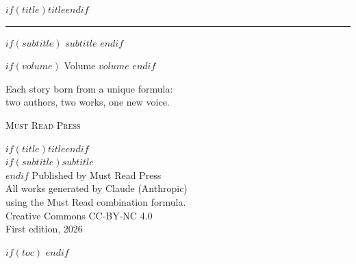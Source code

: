 \documentclass[11pt,twoside,openany]{book}
\let\oldrule\rule
\begin{document}
\begin{titlepage}
  \thispagestyle{empty}
  \vspace*{\fill}
  \begin{center}
    {\displayfont\huge\textcolor{espresso}{$if(title)$$title$$endif$}}

    \vspace{1em}
    \textcolor{goldenrod}{\oldrule{5cm}{0.4pt}}

    $if(subtitle)$
    \vspace{1em}
    {\displayfont\large\textcolor{muted}{\textit{$subtitle$}}}
    $endif$

    $if(volume)$
    \vspace{0.8em}
    {\small\textcolor{muted}{Volume $volume$}}
    $endif$

    \vspace{2em}
    {\small\textcolor{muted}{Each story born from a unique formula:\\
    two authors, two works, one new voice.}}

    \vspace{\fill}
    {\small\textsc{Must Read Press}}
  \end{center}
  \vspace*{\fill}
\end{titlepage}

\thispagestyle{empty}
\vspace*{\fill}
\begin{center}
  {\small
    $if(title)$$title$$endif$\\
    $if(subtitle)$\textit{$subtitle$}\\$endif$
    \vspace{1em}
    Published by Must Read Press\\
    \vspace{0.5em}
    All works generated by Claude (Anthropic)\\
    using the Must Read combination formula.\\
    \vspace{1em}
    Creative Commons CC-BY-NC 4.0\\
    \vspace{0.5em}
    First edition, 2026
  }
\end{center}
\vspace*{\fill}
\clearpage

$if(toc)$
\thispagestyle{plain}
\tableofcontents
\clearpage
$endif$
\end{document}
